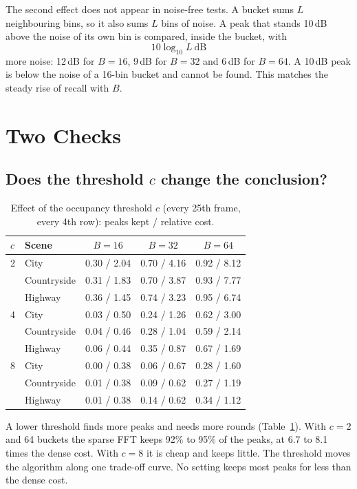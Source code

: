 \documentclass[10pt,a4paper]{article}
\begin{document}
The second effect does not appear in noise-free tests. A bucket sums $L$ neighbouring bins, so it also sums $L$ bins of noise. A peak that stands 10\,dB above the noise of its own bin is compared, inside the bucket, with
\begin{equation}
10 \log_{10} L \ \text{dB}
\end{equation}
more noise: 12\,dB for $B = 16$, 9\,dB for $B = 32$ and 6\,dB for $B = 64$. A 10\,dB peak is below the noise of a 16-bin bucket and cannot be found. This matches the steady rise of recall with $B$.

\section{Two Checks}
\label{sec:checks}
\subsection{Does the threshold $c$ change the conclusion?}
\begin{table}[h]
\caption{Effect of the occupancy threshold $c$ (every 25th frame, every 4th row): peaks kept / relative cost.}
\label{tab:c}
\centering
\begin{tabular}{llccc}
\toprule
$c$ & Scene & $B = 16$ & $B = 32$ & $B = 64$ \\
\midrule
2 & City & 0.30 / 2.04 & 0.70 / 4.16 & 0.92 / 8.12 \\
 & Countryside & 0.31 / 1.83 & 0.70 / 3.87 & 0.93 / 7.77 \\
 & Highway & 0.36 / 1.45 & 0.74 / 3.23 & 0.95 / 6.74 \\
\midrule
4 & City & 0.03 / 0.50 & 0.24 / 1.26 & 0.62 / 3.00 \\
 & Countryside & 0.04 / 0.46 & 0.28 / 1.04 & 0.59 / 2.14 \\
 & Highway & 0.06 / 0.44 & 0.35 / 0.87 & 0.67 / 1.69 \\
\midrule
8 & City & 0.00 / 0.38 & 0.06 / 0.67 & 0.28 / 1.60 \\
 & Countryside & 0.01 / 0.38 & 0.09 / 0.62 & 0.27 / 1.19 \\
 & Highway & 0.01 / 0.38 & 0.14 / 0.62 & 0.34 / 1.12 \\
\bottomrule
\end{tabular}
\end{table}

A lower threshold finds more peaks and needs more rounds (Table~\ref{tab:c}). With $c = 2$ and 64 buckets the sparse FFT keeps 92\% to 95\% of the peaks, at 6.7 to 8.1 times the dense cost. With $c = 8$ it is cheap and keeps little. The threshold moves the algorithm along one trade-off curve. No setting keeps most peaks for less than the dense cost.
\end{document}
